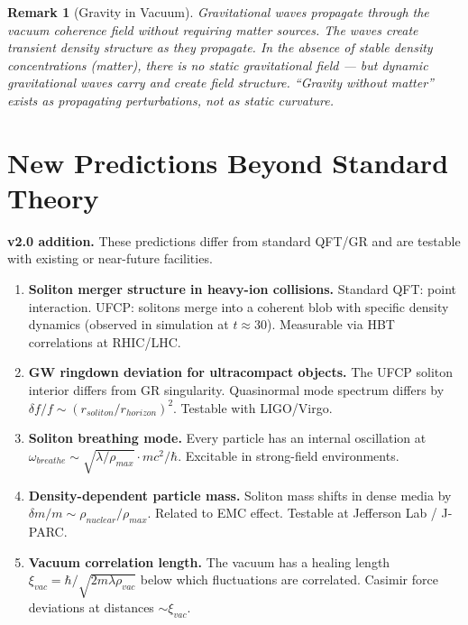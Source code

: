\documentclass[11pt, a4paper]{article}
\newtheorem{remark}{Remark}[section]
\begin{document}
\begin{remark}[Gravity in Vacuum]
Gravitational waves propagate through the vacuum coherence field without
requiring matter sources. The waves create transient density structure
as they propagate. In the absence of stable density concentrations
(matter), there is no static gravitational field --- but dynamic
gravitational waves carry and create field structure. ``Gravity without
matter'' exists as propagating perturbations, not as static curvature.
\end{remark}

\section{New Predictions Beyond Standard Theory}
\label{sec:new-predictions}

\textbf{v2.0 addition.} These predictions differ from standard QFT/GR
and are testable with existing or near-future facilities.

\begin{enumerate}[label=P\arabic*.]
  \item \textbf{Soliton merger structure in heavy-ion collisions.}
        Standard QFT: point interaction. UFCP: solitons merge into a
        coherent blob with specific density dynamics (observed in
        simulation at $t \approx 30$). Measurable via HBT correlations
        at RHIC/LHC.

  \item \textbf{GW ringdown deviation for ultracompact objects.}
        The UFCP soliton interior differs from GR singularity.
        Quasinormal mode spectrum differs by
        $\delta f/f \sim (r_{soliton}/r_{horizon})^2$.
        Testable with LIGO/Virgo.

  \item \textbf{Soliton breathing mode.} Every particle has an internal
        oscillation at $\omega_{breathe} \sim \sqrt{\lambda/\rho_{max}}
        \cdot mc^2/\hbar$. Excitable in strong-field environments.

  \item \textbf{Density-dependent particle mass.} Soliton mass shifts in
        dense media by $\delta m/m \sim \rho_{nuclear}/\rho_{max}$.
        Related to EMC effect. Testable at Jefferson Lab / J-PARC.

  \item \textbf{Vacuum correlation length.} The vacuum has a healing
        length $\xi_{vac} = \hbar/\sqrt{2m\lambda\rho_{vac}}$ below
        which fluctuations are correlated. Casimir force deviations at
        distances $\sim \xi_{vac}$.
\end{enumerate}
\end{document}
